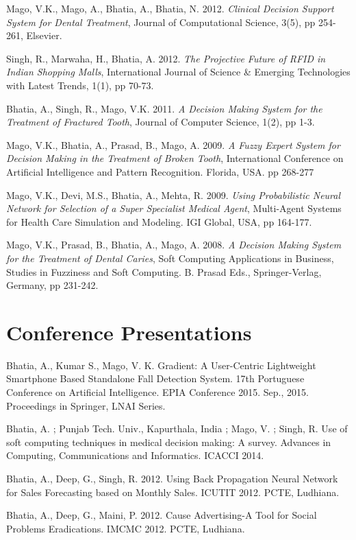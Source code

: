 \documentclass[margin,line]{res}
\begin{document}
\begin{resume}
Mago, V.K., Mago, A., Bhatia, A., Bhatia, N. 2012. \emph{Clinical Decision Support System for Dental Treatment},  Journal of Computational Science, 3(5), pp 254-261, Elsevier.

Singh, R., Marwaha, H., Bhatia, A. 2012. \emph{The Projective Future of RFID in Indian Shopping Malls}, International Journal of Science \& Emerging Technologies with Latest Trends, 1(1), pp 70-73. 

Bhatia, A., Singh, R., Mago, V.K. 2011. \emph{A Decision Making System for the Treatment of Fractured Tooth}, Journal of Computer Science, 1(2), pp 1-3.

Mago, V.K., Bhatia, A., Prasad,  B., Mago, A. 2009. \emph{A Fuzzy Expert System for Decision Making in the Treatment of Broken Tooth}, International Conference on Artificial Intelligence and Pattern Recognition. Florida, USA. pp 268-277

Mago, V.K., Devi, M.S., Bhatia, A., Mehta, R. 2009. \emph{Using Probabilistic Neural Network for Selection of a Super Specialist Medical Agent}, Multi-Agent Systems for Health Care Simulation and Modeling. IGI Global, USA, pp 164-177.

Mago, V.K., Prasad, B., Bhatia, A., Mago, A. 2008. \emph{A Decision Making System for the Treatment of Dental Caries}, Soft Computing Applications in Business, Studies in Fuzziness and Soft Computing. B. Prasad Eds., Springer-Verlag, Germany, pp 231-242.

\section{\sc Conference Presentations}
Bhatia, A., Kumar S., Mago, V. K. Gradient: A User-Centric Lightweight Smartphone Based Standalone Fall Detection System. 17th Portuguese Conference on Artificial Intelligence. EPIA Conference 2015. Sep., 2015. Proceedings in Springer, LNAI Series.

Bhatia, A. ; Punjab Tech. Univ., Kapurthala, India ; Mago, V. ; Singh, R. Use of soft computing techniques in medical decision making: A survey. Advances in Computing, Communications and Informatics. ICACCI 2014.  

Bhatia, A., Deep, G., Singh, R. 2012. Using Back Propagation Neural Network for Sales Forecasting based on Monthly Sales. ICUTIT 2012. PCTE, Ludhiana.

Bhatia, A., Deep, G., Maini, P. 2012. Cause Advertising-A Tool for Social Problems Eradications. IMCMC 2012. PCTE, Ludhiana.


\end{resume}
\end{document}

